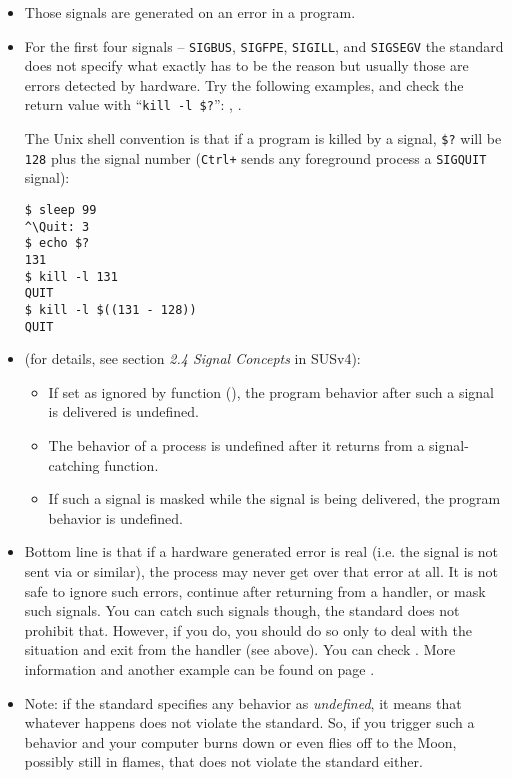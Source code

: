 \begin{itemize}
\item Those signals are generated on an error in a program.
\item \label{SHELLRETVALUEFORSIGNALS} For the first four signals --
\texttt{SIGBUS}, \texttt{SIGFPE}, \texttt{SIGILL}, and \texttt{SIGSEGV} the
standard does not specify what exactly has to be the reason but usually those
are errors detected by hardware.  Try the following examples, and check the
return value with ``\texttt{kill -l \$?}'': ,
.

\par The Unix shell convention is that if a program is killed by a signal,
\texttt{\$?} will be \texttt{128} plus the signal number (\texttt{Ctrl+\bs}
sends any foreground process a \texttt{SIGQUIT} signal):

\begin{verbatim}
$ sleep 99
^\Quit: 3
$ echo $?
131
$ kill -l 131
QUIT
$ kill -l $((131 - 128))
QUIT
\end{verbatim}

\item \label{SPECIALSIGNALS}  (for details, see section \emph{2.4 Signal Concepts} in
SUSv4):
\begin{itemize}
\item If set as ignored by function (), the program behavior
after such a signal is delivered is undefined.
\item The behavior of a process is undefined after it returns from a
signal-catching function.
\item If such a signal is masked while the signal is being delivered, the
program behavior is undefined.
\end{itemize}
\item Bottom line is that if a hardware generated error is real (i.e. the signal
is not sent via  or similar), the process may never get
over that error at all.  It is not safe to ignore such errors, continue after
returning from a handler, or mask such signals.  You can catch such signals
though, the standard does not prohibit that.  However, if you do, you should do
so only to deal with the situation and exit from the handler (see above).
You can check . More information and another
example can be found on page \pageref{THREADS_SIGWAIT}.
\item Note: if the standard specifies any behavior as \emph{undefined}, it means
that whatever happens does not violate the standard.  So, if you trigger such a
behavior and your computer burns down or even flies off to the Moon, possibly
still in flames, that does not violate the standard either.
\end{itemize}

